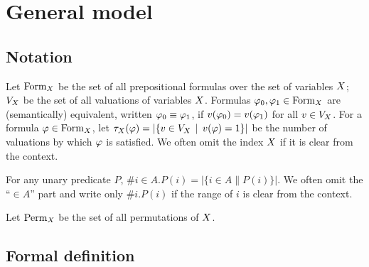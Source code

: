 \chapter{General model}

\section{Notation}
Let $\textrm{Form}_X$ be the set of all prepositional formulas over
  the set of variables $X$;
  $V_X$ be the set of all valuations of variables $X$.
Formulas $\varphi_0, \varphi_1 \in \textrm{Form}_X$ are (semantically) equivalent,
  written $\varphi_0 \equiv \varphi_1$, if
  $v(\varphi_0) = v(\varphi_1)$ for all $v\in V_X$.
For a formula $\varphi\in\textrm{Form}_X$, let
  $\tau_X(\varphi) = |\{ v\in V_X \:\:|\:\: v(\varphi) = 1 \}|$
  be the number of valuations by which $\varphi$ is satisfied.
We often omit the index $X$ if it is clear from the context.

For any unary predicate $P$, $\#i\in A.P(i) = |\{ i\in A \| P(i)\}|$.
  We often omit the ``$\in A$'' part and write only $\#i.P(i)$
  if the range of $i$ is clear from the context.

Let $\textrm{Perm}_X$ be the set of all permutations of $X$.

\section{Formal definition}




